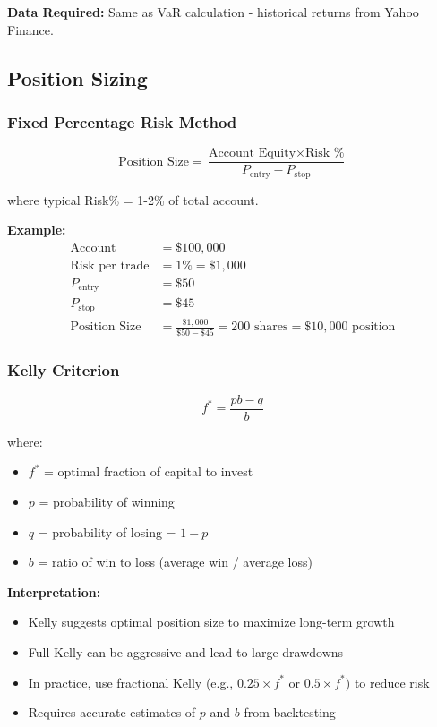\documentclass[11pt,a4paper]{article}
\begin{document}
\textbf{Data Required:} Same as VaR calculation - historical returns from Yahoo Finance.

\subsection{Position Sizing}

\subsubsection{Fixed Percentage Risk Method}

\begin{equation}
\text{Position Size} = \frac{\text{Account Equity} \times \text{Risk \%}}{P_{\text{entry}} - P_{\text{stop}}}
\end{equation}

where typical Risk\% = 1-2\% of total account.

\textbf{Example:}
\begin{align*}
\text{Account} &= \$100,000\\
\text{Risk per trade} &= 1\% = \$1,000\\
P_{\text{entry}} &= \$50\\
P_{\text{stop}} &= \$45\\
\text{Position Size} &= \frac{\$1,000}{\$50 - \$45} = 200 \text{ shares} = \$10,000 \text{ position}
\end{align*}

\subsubsection{Kelly Criterion}

\begin{equation}
f^* = \frac{pb - q}{b}
\end{equation}

where:
\begin{itemize}
    \item $f^*$ = optimal fraction of capital to invest
    \item $p$ = probability of winning
    \item $q$ = probability of losing = $1-p$
    \item $b$ = ratio of win to loss (average win / average loss)
\end{itemize}

\textbf{Interpretation:}
\begin{itemize}
    \item Kelly suggests optimal position size to maximize long-term growth
    \item Full Kelly can be aggressive and lead to large drawdowns
    \item In practice, use fractional Kelly (e.g., $0.25 \times f^*$ or $0.5 \times f^*$) to reduce risk
    \item Requires accurate estimates of $p$ and $b$ from backtesting
\end{itemize}
\end{document}
